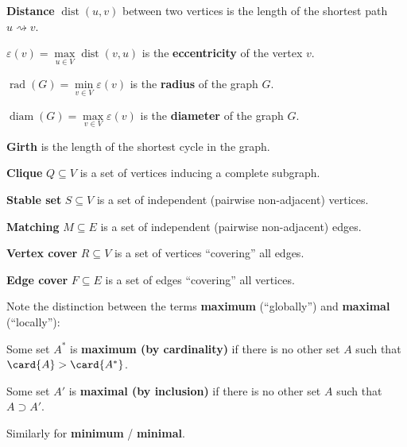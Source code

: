 \documentclass[a4paper,12pt]{article}
\newcommand{\op}[1]{\operatorname*{#1}}
\newcommand{\dist}[1]{\op{dist}(#1)}
\newcommand{\eccentricity}[1]{\varepsilon(#1)}
\newcommand{\graphRadius}[1]{\op{rad}(#1)}
\newcommand{\graphDiameter}[1]{\op{diam}(#1)}
\begin{document}
\begin{terms}
    \item \textbf{Distance} $\dist{u,v}$ between two vertices is the length of the shortest path $u \rightsquigarrow v$.
    \begin{terms}
        \item $\eccentricity{v} = \max\limits_{u \in V} \dist{v,u}$ is the \textbf{eccentricity} of the vertex $v$.
        \item $\graphRadius{G} = \min\limits_{v \in V} \eccentricity{v}$ is the \textbf{radius} of the graph $G$.
        \item $\graphDiameter{G} = \max\limits_{v \in V} \eccentricity{v}$ is the \textbf{diameter} of the graph $G$.
    \end{terms}

    \item \textbf{Girth} is the length of the shortest cycle in the graph.

    \item \textbf{Clique} $Q \subseteq V$ is a set of vertices inducing a complete subgraph.

    \item \textbf{Stable set} $S \subseteq V$ is a set of independent (pairwise non-adjacent) vertices.

    \item \textbf{Matching} $M \subseteq E$ is a set of independent (pairwise non-adjacent) edges.

    \item \textbf{Vertex cover} $R \subseteq V$ is a set of vertices \enquote{covering} all edges.

    \item \textbf{Edge cover} $F \subseteq E$ is a set of edges \enquote{covering} all vertices.

    \item Note the distinction between the terms \textbf{maximum} (\enquote{globally}) and \textbf{maximal} (\enquote{locally}):
    \begin{terms}
        \newcommand{\MySet}{A}
        \item Some set $\MySet^{*}$ is \textbf{maximum (by cardinality)} if there is no other set $\MySet$ such that $\card{\MySet} > \card{\MySet^{*}}$.
        \item Some set $\MySet'$ is \textbf{maximal (by inclusion)} if there is no other set $\MySet$ such that $\MySet \supset \MySet'$.
        \item Similarly for \textbf{minimum} / \textbf{minimal}.
    \end{terms}
\end{terms}
\end{document}
